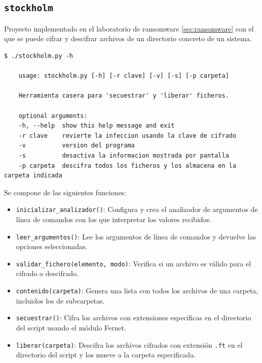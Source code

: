                 \newpage

        \subsection{\texttt{stockholm}}

            Proyecto implementado en el laboratorio de ransomware \ref{sec:ransomware} con el que se puede cifrar y descifrar archivos de un directorio concreto de un sistema.
            \\

            \begin{lstlisting}[style=bash_style, caption={Menú de ayuda del proyecto}]
    $ ./stockholm.py -h

    usage: stockholm.py [-h] [-r clave] [-v] [-s] [-p carpeta]

    Herramienta casera para 'secuestrar' y 'liberar' ficheros.

    optional arguments:
    -h, --help  show this help message and exit
    -r clave    revierte la infeccion usando la clave de cifrado
    -v          version del programa
    -s          desactiva la informacion mostrada por pantalla
    -p carpeta  descifra todos los ficheros y los almacena en la carpeta indicada
            \end{lstlisting}

            Se compone de las siguientes funciones:

            \begin{itemize}
                \item \texttt{inicializar\_analizador()}: Configura y crea el analizador de argumentos de línea de comandos con los que interpretar los valores recibidos.
                \item \texttt{leer\_argumentos()}: Lee los argumentos de línea de comandos y devuelve las opciones seleccionadas.
                \item \texttt{validar\_fichero(elemento, modo)}: Verifica si un archivo es válido para el cifrado o descifrado.
                \item \texttt{contenido(carpeta)}: Genera una lista con todos los archivos de una carpeta, incluidos los de subcarpetas.
                \item \texttt{secuestrar()}: Cifra los archivos con extensiones específicas en el directorio del script usando el módulo Fernet.
                \item \texttt{liberar(carpeta)}: Descifra los archivos cifrados con extensión \texttt{.ft} en el directorio del script y los mueve a la carpeta especificada.
            \end{itemize}

